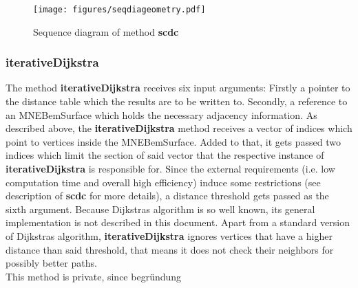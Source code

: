 \clearpage

\begin{figure}[h]
	\begin{center}
		\texttt{[image: figures/seqdiageometry.pdf]}
		\caption{Sequence diagram of method \textbf{scdc}}
	\end{center}
\end{figure}

\clearpage

\subsubsection{iterativeDijkstra}
The method \textbf{iterativeDijkstra} receives six input arguments: Firstly a pointer to the distance table which the results are to be written to. Secondly, a reference to an MNEBemSurface which holds the necessary adjacency information. As described above, the \textbf{iterativeDijkstra} method receives a vector of indices which point to vertices inside the MNEBemSurface. Added to that, it gets passed two indices which limit the section of said vector that the respective instance of \textbf{iterativeDijkstra} is responsible for.
Since the external requirements (i.e. low computation time and overall high efficiency) induce some restrictions (see description of \textbf{scdc} for more details), a distance threshold gets passed as the sixth argument. Because Dijkstras algorithm is so well known, its general implementation is not described in this document. Apart from a standard version of Dijkstras algorithm, \textbf{iterativeDijkstra} ignores vertices that have a higher distance than said threshold, that means it does not check their neighbors for possibly better paths.\\
This method is private, since begründung


